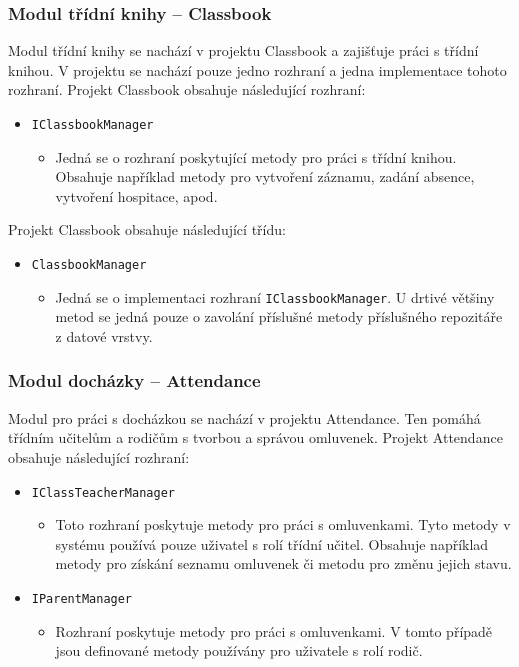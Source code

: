 \subsubsection{Modul třídní knihy -- Classbook}
Modul třídní knihy se nachází v projektu Classbook a zajišťuje práci s třídní knihou. V projektu se nachází pouze jedno rozhraní a jedna implementace tohoto rozhraní. Projekt Classbook obsahuje následující rozhraní:
\begin{itemize}
    \item \texttt{IClassbookManager}
    \begin{itemize}
        \item Jedná se o rozhraní poskytující metody pro práci s třídní knihou. Obsahuje například metody pro vytvoření záznamu, zadání absence, vytvoření hospitace, apod.
    \end{itemize}
\end{itemize}

Projekt Classbook obsahuje následující třídu:
\begin{itemize}
    \item \texttt{ClassbookManager}
    \begin{itemize}
        \item Jedná se o implementaci rozhraní \texttt{IClassbookManager}. U drtivé většiny metod se jedná pouze o zavolání příslušné metody příslušného repozitáře z datové vrstvy.
    \end{itemize}
\end{itemize}

\subsubsection{Modul docházky -- Attendance}
Modul pro práci s docházkou se nachází v projektu Attendance. Ten pomáhá třídním učitelům a rodičům s tvorbou a správou omluvenek. Projekt Attendance obsahuje následující rozhraní:
\begin{itemize}
    \item \texttt{IClassTeacherManager}
    \begin{itemize}
        \item Toto rozhraní poskytuje metody pro práci s omluvenkami. Tyto metody v systému používá pouze uživatel s rolí třídní učitel. Obsahuje například metody pro získání seznamu omluvenek či metodu pro změnu jejich stavu.
    \end{itemize}
    
    \item \texttt{IParentManager}
    \begin{itemize}
        \item Rozhraní poskytuje metody pro práci s omluvenkami. V tomto případě jsou definované metody používány pro uživatele s rolí rodič. 
    \end{itemize}
\end{itemize}


